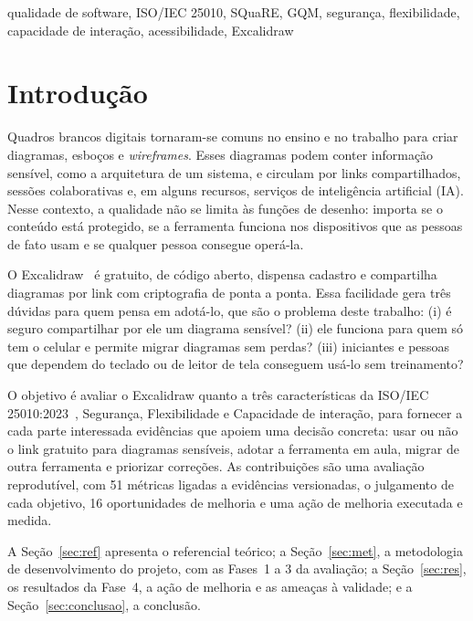 \documentclass[conference]{IEEEtran}
\begin{document}
\begin{IEEEkeywords}
qualidade de software, ISO/IEC 25010, SQuaRE, GQM, segurança, flexibilidade,
capacidade de interação, acessibilidade, Excalidraw
\end{IEEEkeywords}

\section{Introdução}
\label{sec:intro}

Quadros brancos digitais tornaram-se comuns no ensino e no trabalho para criar
diagramas, esboços e \textit{wireframes}. Esses diagramas podem conter
informação sensível, como a arquitetura de um sistema, e circulam por links
compartilhados, sessões colaborativas e, em alguns recursos, serviços de
inteligência artificial (IA). Nesse contexto, a qualidade não se limita às
funções de desenho: importa se o conteúdo está protegido, se a ferramenta
funciona nos dispositivos que as pessoas de fato usam e se qualquer pessoa
consegue operá-la.

O Excalidraw~\cite{excalidraw} é gratuito, de código aberto, dispensa cadastro
e compartilha diagramas por link com criptografia de ponta a ponta. Essa
facilidade gera três dúvidas para quem pensa em adotá-lo, que são o problema
deste trabalho: (i) é seguro compartilhar por ele um diagrama sensível?
(ii) ele funciona para quem só tem o celular e permite migrar diagramas sem
perdas? (iii) iniciantes e pessoas que dependem do teclado ou de leitor de
tela conseguem usá-lo sem treinamento?

O objetivo é avaliar o Excalidraw quanto a três características da
ISO/IEC 25010:2023~\cite{iso25010}, Segurança, Flexibilidade e Capacidade de
interação, para fornecer a cada parte interessada evidências que apoiem uma
decisão concreta: usar ou não o link gratuito para diagramas sensíveis, adotar
a ferramenta em aula, migrar de outra ferramenta e priorizar correções. As
contribuições são uma avaliação reprodutível, com 51 métricas ligadas a
evidências versionadas, o julgamento de cada objetivo, 16 oportunidades de
melhoria e uma ação de melhoria executada e medida.

A Seção~\ref{sec:ref} apresenta o referencial teórico; a
Seção~\ref{sec:met}, a metodologia de desenvolvimento do projeto, com as
Fases~1 a 3 da avaliação; a Seção~\ref{sec:res}, os resultados da Fase~4, a
ação de melhoria e as ameaças à validade; e a
Seção~\ref{sec:conclusao}, a conclusão.
\end{document}
